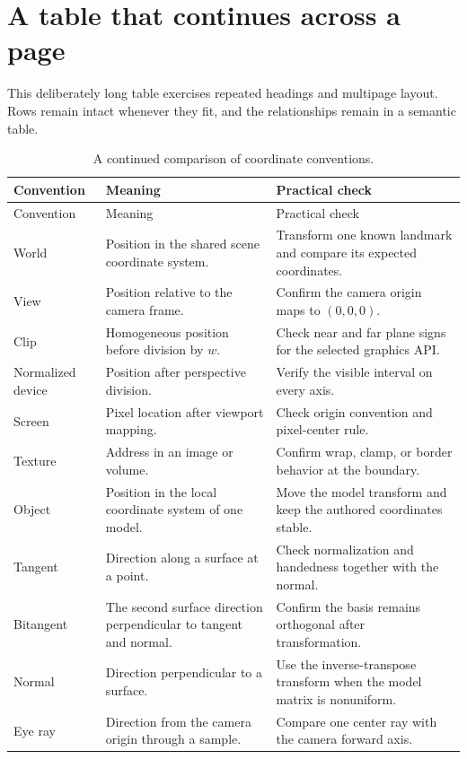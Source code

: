 \documentclass[11pt,twoside,openany]{book}
\begin{document}
\section{A table that continues across a page}
This deliberately long table exercises repeated headings and multipage layout. Rows remain intact whenever they fit, and the relationships remain in a semantic table.
\begin{longtable}{@{}>{\raggedright\arraybackslash}p{}>{\raggedright\arraybackslash}p{}>{\raggedright\arraybackslash}p{}@{}}
\caption{A continued comparison of coordinate conventions.}\label{tab:continued}\\
\toprule Convention & Meaning & Practical check \\
\midrule\endfirsthead
\toprule Convention & Meaning & Practical check \\
\midrule\endhead
World & Position in the shared scene coordinate system. & Transform one known landmark and compare its expected coordinates. \\
View & Position relative to the camera frame. & Confirm the camera origin maps to $(0,0,0)$. \\
Clip & Homogeneous position before division by $w$. & Check near and far plane signs for the selected graphics API. \\
Normalized device & Position after perspective division. & Verify the visible interval on every axis. \\
Screen & Pixel location after viewport mapping. & Check origin convention and pixel-center rule. \\
Texture & Address in an image or volume. & Confirm wrap, clamp, or border behavior at the boundary. \\
Object & Position in the local coordinate system of one model. & Move the model transform and keep the authored coordinates stable. \\
Tangent & Direction along a surface at a point. & Check normalization and handedness together with the normal. \\
Bitangent & The second surface direction perpendicular to tangent and normal. & Confirm the basis remains orthogonal after transformation. \\
Normal & Direction perpendicular to a surface. & Use the inverse-transpose transform when the model matrix is nonuniform. \\
Eye ray & Direction from the camera origin through a sample. & Compare one center ray with the camera forward axis. \\

\end{longtable}
\end{document}
